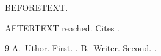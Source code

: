 \documentclass{article}
\begin{document}
BEFORETEXT.

AFTERTEXT reached. Cites \cite{a,b}.
\begin{thebibliography}{9}
 A.~Uthor. \newblock First. .
 B.~Writer. \newblock Second. .
\end{thebibliography}
\end{document}
